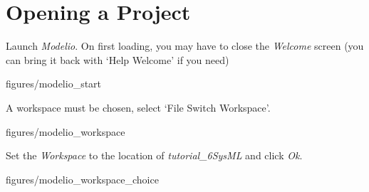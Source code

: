 \documentclass[11pt,a4paper]{../tutorial}
\begin{document}


\newpage

\section{Opening a Project}

\begin{instructions}

\item Launch \emph{Modelio}. On first loading, you may have to close the \emph{Welcome} screen (you can bring it back with `Help \menusep Welcome' if you need)

\begin{center}
\begin{annotation}[width=1\linewidth,trim=0 400 0 0,clip]{figures/modelio_start}
    \end{annotation}
\end{center}

\item A workspace must be chosen, select `File \menusep Switch Workspace’.

\begin{center}
\begin{annotation}[width=1\linewidth,trim=0 700 0 0,clip]{figures/modelio_workspace}
    \end{annotation}
\end{center}


\newpage

\item Set the \emph{Workspace} to the location of \emph{tutorial\_6\pathsep{}SysML} and click \emph{Ok}.

\begin{center}
\begin{annotation}[width=0.5\linewidth,trim=0 0 0 0,clip]{figures/modelio_workspace_choice}
    \end{annotation}
\end{center}



\end{instructions}
\end{document}
